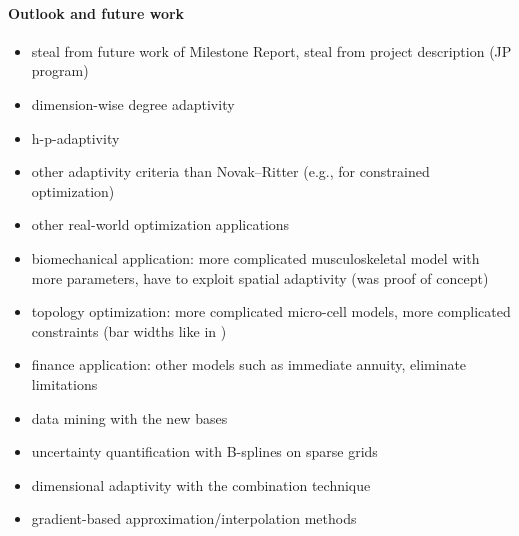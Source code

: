 \dummytext[5]{}

\paragraph{Outlook and future work}


\begin{itemize}
  \item
  steal from future work of Milestone Report,
  steal from project description (JP program)
  
  \item
  dimension-wise degree adaptivity
  
  \item
  h-p-adaptivity
  
  \item
  other adaptivity criteria than Novak--Ritter
  (e.g., for constrained optimization)
  
  \item
  other real-world optimization applications
  
  \item
  biomechanical application: more complicated musculoskeletal model
  with more parameters, have to exploit spatial adaptivity
  (was proof of concept)
  
  \item
  topology optimization: more complicated micro-cell models,
  more complicated constraints (bar widths like in \cite{Allaire16Towards})
  
  \item
  finance application: other models such as immediate annuity,
  eliminate limitations
  
  \item
  data mining with the new bases
  
  \item
  uncertainty quantification with B-splines on sparse grids
  
  \item
  dimensional adaptivity with the combination technique
  
  \item
  gradient-based approximation/interpolation methods
  \cite{Baar15Gradient}
\end{itemize}

\dummytext[5]{}

\cleardoublepage
